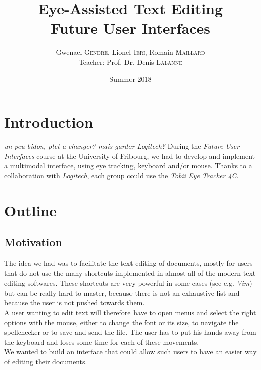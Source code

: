 \documentclass[12pt, a4paper, twoside]{article}
\title{\huge{\textbf{Eye-Assisted Text Editing }\\ Future User Interfaces}}
\author{Gwenael \textsc{Gendre}, Lionel \textsc{Ieri}, Romain \textsc{Maillard} \\
	Teacher: Prof. Dr. Denis \textsc{Lalanne}}
\date{Summer 2018}
\begin{document}
 
\begin{titlepage}
\maketitle
\end{titlepage}
\tableofcontents
\newpage

\section{Introduction}
\textit{un peu bidon, ptet a changer? mais garder Logitech?}
During the \textit{Future User Interfaces} course at the University of Fribourg, we had to develop and implement a multimodal interface, using eye tracking, keyboard and/or mouse. Thanks to a collaboration with \textit{Logitech}, each group could use the \textit{Tobii Eye Tracker 4C}. 

\section{Outline}

\subsection{Motivation}
The idea we had was to facilitate the text editing of documents, mostly for users that do not use the many shortcuts implemented in almost all of the modern text editing softwares. These shortcuts are very powerful in some cases (see e.g. \textit{Vim}) but can be really hard to master, because there is not an exhaustive list and because the user is not pushed towards them. \\
A user wanting to edit text will therefore have to open menus and select the right options with the mouse, either to change the font or its size, to navigate the spellchecker or to save and send the file. The user has to put his hands away from the keyboard and loses some time for each of these movements. \\
We wanted to build an interface that could allow such users to have an easier way of editing their documents. 
\end{document}

